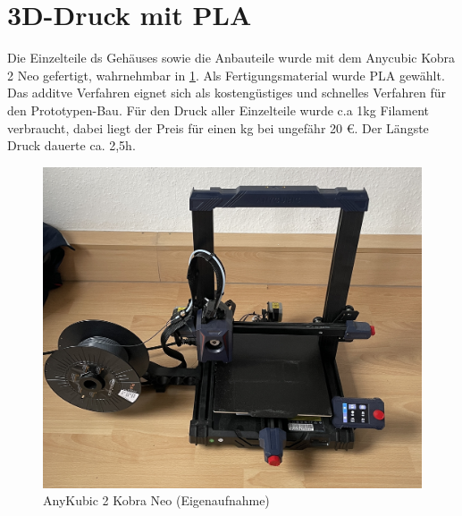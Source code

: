 \section{3D-Druck mit PLA}
Die Einzelteile ds Gehäuses sowie die Anbauteile wurde mit dem Anycubic Kobra 2 Neo gefertigt, wahrnehmbar in \ref{AKK2N}. Als Fertigungsmaterial wurde PLA gewählt. Das additve Verfahren eignet sich als kostengüstiges und schnelles Verfahren für den Prototypen-Bau. Für den Druck aller Einzelteile wurde c.a 1kg Filament verbraucht, dabei liegt der Preis für einen kg bei ungefähr 20 €. Der Längste Druck dauerte ca. 2,5h. 

 \begin{figure}[H]
 	\begin{center}
 		\includegraphics[width=\textwidth]{Images/Konstruktion/AKK2N.jpg}
 		\caption{AnyKubic 2 Kobra Neo (Eigenaufnahme)} \label{AKK2N}
 	\end{center}
 \end{figure}  